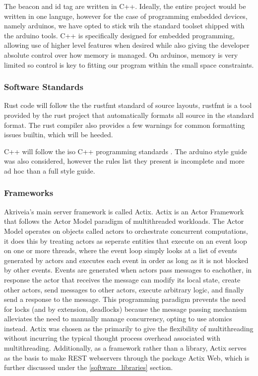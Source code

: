 \bigskip
The beacon and id tag are written in C++.
Ideally, the entire project would be written in one languge, however for the case of programming embedded devices, namely arduinos, we have opted to stick wih the standard toolset shipped with the arduino tools.
C++ is specifically designed for embedded programming, allowing use of higher level features when desired while also giving the developer absolute control over how memory is managed.
On arduinos, memory is very limited so control is key to fitting our program within the small space constraints.


\bigskip
\subsubsection{Software Standards}
Rust code will follow the the rustfmt standard of source layouts, rustfmt is a tool provided by the rust project that automatically formats all source in the standard format. The rust compiler also provides a few warnings for common formatting issues builtin, which will be heeded.

\bigskip
C++ will follow the iso C++ programming standards \cite{cpp_core_guidelines}. The arduino style guide \cite{arduino_style_guide} was also considered, however the rules list they present is incomplete and more ad hoc than a full style guide.

\subsubsection{Frameworks}
Akriveia's main server framework is called Actix.
Actix is an Actor Framework that follows the Actor Model paradigm of multithreaded workloads.
The Actor Model operates on objects called actors to orchestrate concurrent computations, it does this by treating actors as seperate entities that execute on an event loop on one or more threads, where the event loop simply looks at a list of events generated by actors and executes each event in order as long as it is not blocked by other events.
Events are generated when actors pass messages to eachother, in response the actor that receives the message can modify its local state, create other actors, send messages to other actors, execute arbitrary logic, and finally send a response to the message.
This programming paradigm prevents the need for locks (and by extension, deadlocks) because the message passing mechanism alleviates the need to manually manage concurrency, opting to use atomics instead.
\bigskip
Actix was chosen as the primarily to give the flexibility of multithreading without incurring the typical thought process overhead associated with multithreading. Additionally, as a framework rather than a library, Actix serves as the basis to make REST webservers through the package Actix Web, which is further discussed under the \ref{software_libraries} section.

